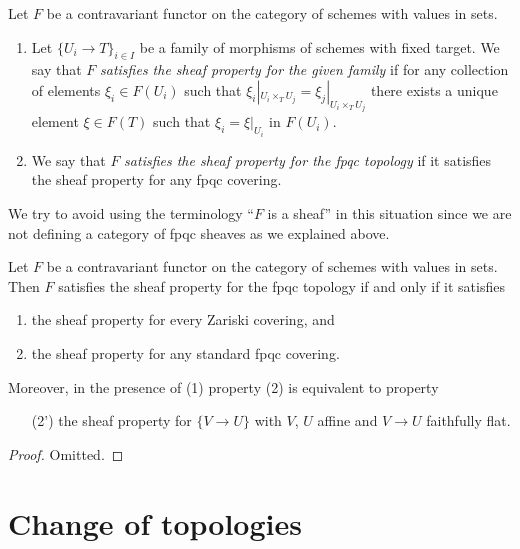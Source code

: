 \begin{definition}
\label{definition-sheaf-property-fpqc}
Let $F$ be a contravariant functor on the category
of schemes with values in sets.
\begin{enumerate}
\item Let $\{U_i \to T\}_{i \in I}$ be a family of morphisms
of schemes with fixed target.
We say that $F$ {\it satisfies the sheaf property for the given family}
if for any collection of elements $\xi_i \in F(U_i)$ such that
$\xi_i|_{U_i \times_T U_j} = \xi_j|_{U_i \times_T U_j}$
there exists a unique element
$\xi \in F(T)$ such that $\xi_i = \xi|_{U_i}$ in $F(U_i)$.
\item We say that $F$ {\it satisfies the sheaf property for the
fpqc topology} if it satisfies the sheaf property for any
fpqc covering.
\end{enumerate}
\end{definition}

\noindent
We try to avoid using the terminology ``$F$ is a sheaf'' in this
situation since we are not defining a category of fpqc sheaves
as we explained above.

\begin{lemma}
\label{lemma-sheaf-property-fpqc}
Let $F$ be a contravariant functor on the category
of schemes with values in sets. Then $F$ satisfies
the sheaf property for the fpqc topology if and only
if it satisfies
\begin{enumerate}
\item the sheaf property for every Zariski covering, and
\item the sheaf property for any standard fpqc covering.
\end{enumerate}
Moreover, in the presence of (1) property (2) is equivalent to
property
\begin{enumerate}
\item[(2')] the sheaf property for $\{V \to U\}$
with $V$, $U$ affine and $V \to U$ faithfully flat.
\end{enumerate}
\end{lemma}

\begin{proof}
Omitted.
\end{proof}












\section{Change of topologies}
\label{section-change-topologies}

